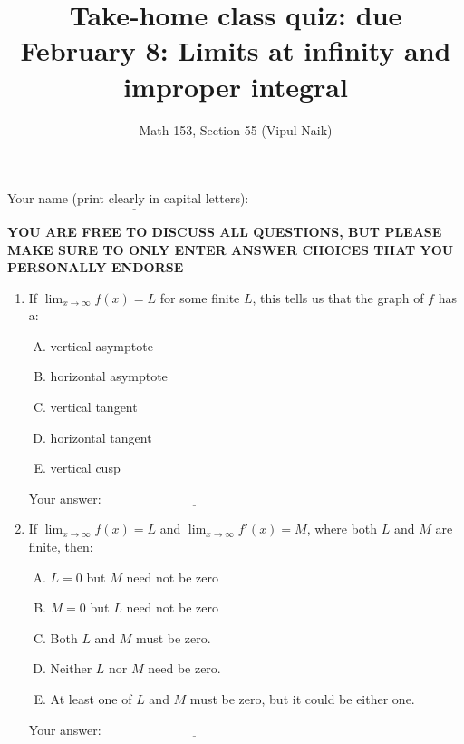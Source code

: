 \documentclass[10pt]{amsart}
\title{Take-home class quiz: due February 8: Limits at infinity and improper integral}
\author{Math 153, Section 55 (Vipul Naik)}
\begin{document}
\maketitle

Your name (print clearly in capital letters): $\underline{\qquad\qquad\qquad\qquad\qquad\qquad\qquad\qquad\qquad\qquad}$

{\bf YOU ARE FREE TO DISCUSS ALL QUESTIONS, BUT PLEASE MAKE SURE TO
ONLY ENTER ANSWER CHOICES THAT YOU PERSONALLY ENDORSE}

\begin{enumerate}

\item If $\lim_{x \to \infty} f(x) = L$ for some finite $L$, this tells
  us that the graph of $f$ has a:

  \begin{enumerate}[(A)]
  \item vertical asymptote
  \item horizontal asymptote
  \item vertical tangent
  \item horizontal tangent
  \item vertical cusp
  \end{enumerate}

  \vspace{0.1in}
  Your answer: $\underline{\qquad\qquad\qquad\qquad\qquad\qquad\qquad}$
  \vspace{0.15in}

\item If $\lim_{x \to \infty} f(x) = L$ and $\lim_{x \to \infty} f'(x)
  = M$, where both $L$ and $M$ are finite, then:

  \begin{enumerate}[(A)]
  \item $L = 0$ but $M$ need not be zero
  \item $M = 0$ but $L$ need not be zero
  \item Both $L$ and $M$ must be zero.
  \item Neither $L$ nor $M$ need be zero.
  \item At least one of $L$ and $M$ must be zero, but it could be
    either one.
  \end{enumerate}

  \vspace{0.1in}
  Your answer: $\underline{\qquad\qquad\qquad\qquad\qquad\qquad\qquad}$
  \vspace{0.15in}


\end{enumerate}
\end{document}
